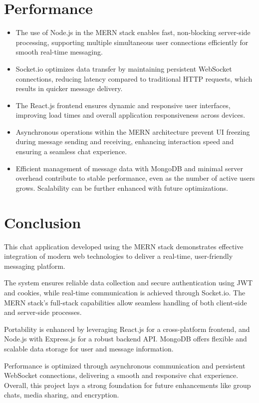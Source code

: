 \documentclass[12pt,a4paper]{report}
\begin{document}
\section{Performance}
\begin{itemize}
\item The use of Node.js in the MERN stack enables fast, non-blocking server-side processing, supporting multiple simultaneous user connections efficiently for smooth real-time messaging.
\item Socket.io optimizes data transfer by maintaining persistent WebSocket connections, reducing latency compared to traditional HTTP requests, which results in quicker message delivery.
\item The React.js frontend ensures dynamic and responsive user interfaces, improving load times and overall application responsiveness across devices.
\item Asynchronous operations within the MERN architecture prevent UI freezing during message sending and receiving, enhancing interaction speed and ensuring a seamless chat experience.
\item Efficient management of message data with MongoDB and minimal server overhead contribute to stable performance, even as the number of active users grows. Scalability can be further enhanced with future optimizations.
\end{itemize}

\section{Conclusion}
This chat application developed using the MERN stack demonstrates effective integration of modern web technologies to deliver a real-time, user-friendly messaging platform.

The system ensures reliable data collection and secure authentication using JWT and cookies, while real-time communication is achieved through Socket.io. The MERN stack’s full-stack capabilities allow seamless handling of both client-side and server-side processes.

Portability is enhanced by leveraging React.js for a cross-platform frontend, and Node.js with Express.js for a robust backend API. MongoDB offers flexible and scalable data storage for user and message information.

Performance is optimized through asynchronous communication and persistent WebSocket connections, delivering a smooth and responsive chat experience. Overall, this project lays a strong foundation for future enhancements like group chats, media sharing, and encryption.
\end{document}
